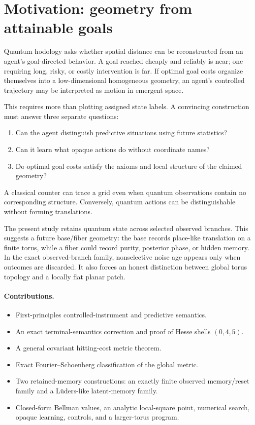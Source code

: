 \documentclass[11pt]{article}
\theoremstyle{definition}
\theoremstyle{remark}
\begin{document}
\section{Motivation: geometry from attainable goals}

Quantum hodology asks whether spatial distance can be reconstructed from an
agent's goal-directed behavior. A goal reached cheaply and reliably is near;
one requiring long, risky, or costly intervention is far. If optimal goal
costs organize themselves into a low-dimensional homogeneous geometry, an
agent's controlled trajectory may be interpreted as motion in emergent space.

This requires more than plotting assigned state labels. A convincing
construction must answer three separate questions:
\begin{enumerate}
\item Can the agent distinguish predictive situations using future
statistics?
\item Can it learn what opaque actions do without coordinate names?
\item Do optimal goal costs satisfy the axioms and local structure of the
claimed geometry?
\end{enumerate}
A classical counter can trace a grid even when quantum observations contain
no corresponding structure. Conversely, quantum actions can be
distinguishable without forming translations.

The present study retains quantum state across selected observed branches.
This suggests a future base/fiber geometry: the base records place-like
translation on a finite torus, while a fiber could record purity, posterior
phase, or hidden memory. In the exact observed-branch family, nonselective
noise age appears only when outcomes are discarded. It also forces an honest distinction between global
torus topology and a locally flat planar patch.

\paragraph{Contributions.}
\begin{itemize}
\item First-principles controlled-instrument and predictive semantics.
\item An exact terminal-semantics correction and proof of Hesse shells
\((0,4,5)\).
\item A general covariant hitting-cost metric theorem.
\item Exact Fourier--Schoenberg classification of the global metric.
\item Two retained-memory constructions: an exactly finite observed
memory/reset family and a Lüders-like latent-memory family.
\item Closed-form Bellman values, an analytic local-square point, numerical
search, opaque learning, controls, and a larger-torus program.
\end{itemize}
\end{document}
